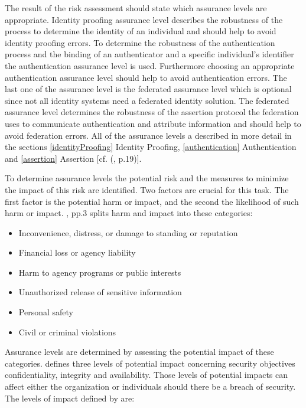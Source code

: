 The result of the risk assessment should state which assurance levels are appropriate. Identity proofing assurance level describes the robustness of the process to determine the identity of an individual and should help to avoid identity proofing errors. To determine the robustness of the authentication process and the binding of an authenticator and a specific individual's identifier the authentication assurance level is used. Furthermore choosing an appropriate authentication assurance level should help to avoid authentication errors. The last one of the assurance level is the federated assurance level which is optional since not all identity systems need a federated identity solution. The federated assurance level determines the robustness of the assertion protocol the federation uses to communicate authentication and attribute information and should help to avoid federation errors. All of the assurance levels a described in more detail in the sections \ref{identityProofing} Identity Proofing, \ref{authentication} Authentication and  \ref{assertion} Assertion [cf. (\cite{NIST:2017:DIG}, p.19)]. 

To determine assurance levels the potential risk and the measures to minimize the impact of this risk are identified. Two factors are crucial for this task. The first factor is the potential harm or impact, and the second the likelihood of such harm or impact. \cite{Bolton:2003:EAuth}, pp.3 splits harm and impact into these categories:

\begin{itemize}
	\item Inconvenience, distress, or damage to standing or reputation
	\item Financial loss or agency liability
	\item Harm to agency programs or public interests
	\item Unauthorized release of sensitive information
	\item Personal safety
	\item Civil or criminal violations
\end{itemize}

Assurance levels are determined by assessing the potential impact of these categories. \cite{NIST:2004:FIOPS} defines three levels of potential impact concerning security objectives confidentiality, integrity and availability. Those levels of potential impacts can affect either the organization or individuals should there be a breach of security. The levels of impact defined by \cite{NIST:2004:FIOPS} are:

